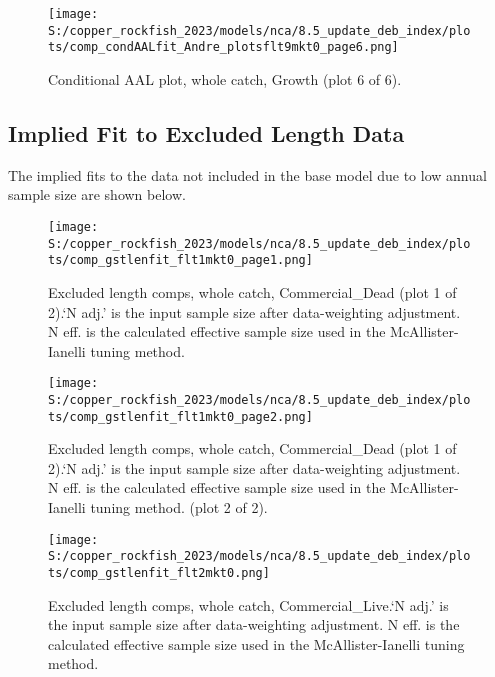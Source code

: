 \documentclass[11pt,
  english,
  letterpaper,
]{article}
\begin{document}
\begin{figure}
\centering
\texttt{[image: S:/copper\_rockfish\_2023/models/nca/8.5\_update\_deb\_index/plots/comp\_condAALfit\_Andre\_plotsflt9mkt0\_page6.png]}
\caption{Conditional AAL plot, whole catch, Growth (plot 6 of 6).\label{fig:comp_condAALfit_Andre_plotsflt9mkt0_page6}}
\end{figure}

\hypertarget{excluded-data}{%
\subsection{Implied Fit to Excluded Length Data}\label{excluded-data}}

The implied fits to the data not included in the base model due to low annual sample size are shown below.

\begin{figure}
\centering
\texttt{[image: S:/copper\_rockfish\_2023/models/nca/8.5\_update\_deb\_index/plots/comp\_gstlenfit\_flt1mkt0\_page1.png]}
\caption{Excluded length comps, whole catch, Commercial\_Dead (plot 1 of 2).`N adj.' is the input sample size after data-weighting adjustment. N eff. is the calculated effective sample size used in the McAllister-Ianelli tuning method.\label{fig:comp_gstlenfit_flt1mkt0_page1}}
\end{figure}

\begin{figure}
\centering
\texttt{[image: S:/copper\_rockfish\_2023/models/nca/8.5\_update\_deb\_index/plots/comp\_gstlenfit\_flt1mkt0\_page2.png]}
\caption{Excluded length comps, whole catch, Commercial\_Dead (plot 1 of 2).`N adj.' is the input sample size after data-weighting adjustment. N eff. is the calculated effective sample size used in the McAllister-Ianelli tuning method. (plot 2 of 2).\label{fig:comp_gstlenfit_flt1mkt0_page2}}
\end{figure}

\begin{figure}
\centering
\texttt{[image: S:/copper\_rockfish\_2023/models/nca/8.5\_update\_deb\_index/plots/comp\_gstlenfit\_flt2mkt0.png]}
\caption{Excluded length comps, whole catch, Commercial\_Live.`N adj.' is the input sample size after data-weighting adjustment. N eff. is the calculated effective sample size used in the McAllister-Ianelli tuning method.\label{fig:comp_gstlenfit_flt2mkt0}}
\end{figure}
\end{document}
